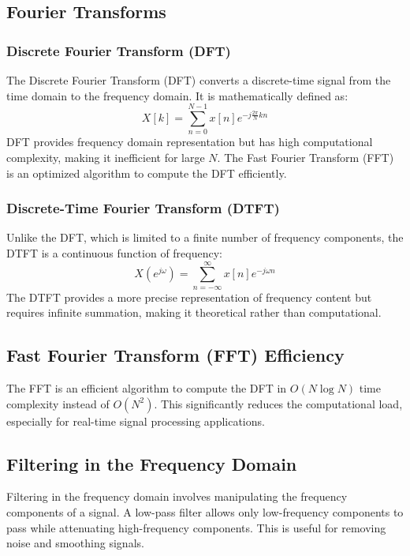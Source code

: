 \documentclass[a4paper,12pt]{article}
\begin{document}
\subsection*{Fourier Transforms}
\subsubsection*{Discrete Fourier Transform (DFT)}
The Discrete Fourier Transform (DFT) converts a discrete-time signal from the time domain to the frequency domain. It is mathematically defined as:
\begin{equation}
    X[k] = \sum_{n=0}^{N-1} x[n] e^{-j \frac{2\pi}{N} kn}
\end{equation}
DFT provides frequency domain representation but has high computational complexity, making it inefficient for large $N$. The Fast Fourier Transform (FFT) is an optimized algorithm to compute the DFT efficiently.

\subsubsection*{Discrete-Time Fourier Transform (DTFT)}
Unlike the DFT, which is limited to a finite number of frequency components, the DTFT is a continuous function of frequency:
\begin{equation}
    X(e^{j\omega}) = \sum_{n=-\infty}^{\infty} x[n] e^{-j\omega n}
\end{equation}
The DTFT provides a more precise representation of frequency content but requires infinite summation, making it theoretical rather than computational.

\subsection*{Fast Fourier Transform (FFT) Efficiency}
The FFT is an efficient algorithm to compute the DFT in $O(N \log N)$ time complexity instead of $O(N^2)$. This significantly reduces the computational load, especially for real-time signal processing applications.

\subsection*{Filtering in the Frequency Domain}
Filtering in the frequency domain involves manipulating the frequency components of a signal. A low-pass filter allows only low-frequency components to pass while attenuating high-frequency components. This is useful for removing noise and smoothing signals.
\end{document}

